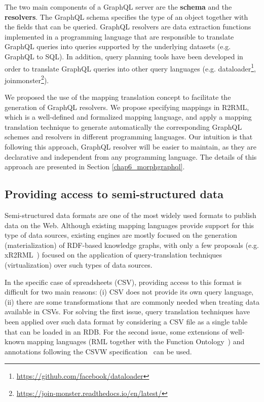 The two main components of a GraphQL server are the \textbf{schema} and the \textbf{resolvers}. The GraphQL schema specifies the type of an object together with the fields that can be queried. GraphQL resolvers are data extraction functions implemented in a programming language that are responsible to translate GraphQL queries into queries supported by the underlying datasets (e.g. GraphQL to SQL). In addition, query planning tools have been developed in order to translate GraphQL queries into other query languages (e.g. dataloader\footnote{\url{https://github.com/facebook/dataloader}}, joinmonster\footnote{\url{https://join-monster.readthedocs.io/en/latest/}}).

We proposed the use of the mapping translation concept to facilitate the generation of GraphQL resolvers. We propose specifying mappings in R2RML, which is a well-defined and formalized mapping language, and apply a mapping translation technique to generate automatically the corresponding GraphQL schemes and resolvers in different programming languages. Our intuition is that following this approach, GraphQL resolver will be easier to maintain, as they are declarative and independent from any programming language. The details of this approach are presented in Section \ref{chap6_morphgraphql}.

\subsection{Providing access to semi-structured data}
Semi-structured data formats are one of the most widely used formats to publish data on the Web. Although existing mapping languages provide support for this type of data sources, existing engines are mostly focused on the generation (materialization) of RDF-based knowledge graphs, with only a few proposals (e.g. xR2RML~\citep{michel2015translation}) focused on the application of query-translation techniques (virtualization) over such types of data sources.

In the specific case of spreadsheets (CSV), providing access to this format is difficult for two main reasons: (i) CSV does not provide its own query language, (ii) there are some transformations that are commonly needed when treating data available in CSVs. For solving the first issue, query translation techniques have been applied over such data format by considering a CSV file as a single table that can be loaded in an RDB. For the second issue, some extensions of well-known mapping languages (RML together with the Function Ontology~\citep{de2017declarative}) and annotations following the CSVW specification~\citep{tennison2015model} can be used.

